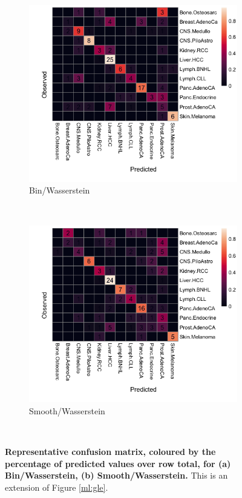 \begin{figure}[ht!]
    \begin{subfigure}{.5\textwidth}
    \centering
    \includegraphics[width=\textwidth,height=0.9\textwidth]{graphics/confusion_matrix_bins_wasserstein.png}
    \caption{Bin/Wasserstein}
    \label{fig:confusion_bin_Wasserstein}
    \end{subfigure}
    ~
    \begin{subfigure}{.5\textwidth}
    \centering
    \includegraphics[width=\textwidth,height=0.9\textwidth]{graphics/confusion_matrix_smooth_wasserstein.png}
    \caption{Smooth/Wasserstein}
    \label{fig:confusion_smooth_wasserstein}
    \end{subfigure} \\
    
    \caption{\textbf{Representative confusion matrix, coloured by the percentage of predicted values over row total, for (a) Bin/Wasserstein, (b) Smooth/Wasserstein.} This is an extension of Figure \ref{ml:gle}.}
    \label{fig:apdx_ml_gle}
\end{figure}